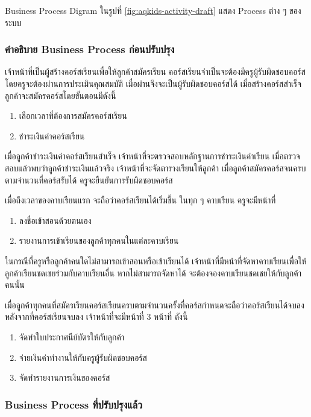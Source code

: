 Business Process Digram ในรูปที่ \ref{fig:aqkids-activity-draft} แสดง Process ต่าง ๆ ของระบบ

\subsubsection{คำอธิบาย Business Process ก่อนปรับปรุง}

เจ้าหน้าที่เป็นผู้สร้างคอร์สเรียนเพื่อให้ลูกค้าสมัครเรียน คอร์สเรียนจำเป็นจะต้องมีครูผู้รับผิดชอบคอร์ส โดยครูจะต้องผ่านการประเมินคุณสมบัติ เมื่อผ่านจึงจะเป็นผู้รับผิดชอบคอร์สได้ เมื่อสร้างคอร์สสำเร็จ ลูกค้าจะสมัครคอร์สโดยขั้นตอนมีดังนี้

\begin{enumerate}
    \item เลือกเวลาที่ต้องการสมัครคอร์สเรียน
    \item ชำระเงินค่าคอร์สเรียน
\end{enumerate}

เมื่อลูกค้าชำระเงินค่าคอร์สเรียนสำเร็จ เจ้าหน้าที่จะตรวจสอบหลักฐานการชำระเงินค่าเรียน เมื่อตรวจสอบแล้วพบว่าลูกค้าชำระเงินแล้วจริง เจ้าหน้าที่จะจัดตารางเรียนให้ลูกค้า เมื่อลูกค้าสมัครคอร์สจนครบตามจำนวนที่คอร์สรับได้ ครูจะยืนยันการรับผิดชอบคอร์ส

เมื่อถึงเวลาของคาบเรียนแรก จะถือว่าคอร์สเรียนได้เริ่มขึ้น ในทุก ๆ คาบเรียน ครูจะมีหน้าที่

\begin{enumerate}
    \item ลงชื่อเข้าสอนด้วยตนเอง
    \item รายงานการเข้าเรียนของลูกค้าทุกคนในแต่ละคาบเรียน
\end{enumerate}

ในกรณีที่ครูหรือลูกค้าคนใดไม่สามารถเข้าสอนหรือเข้าเรียนได้ เจ้าหน้าที่มีหน้าที่จัดหาคาบเรียนเพื่อให้ลูกค้าเรียนชดเชยร่วมกับคาบเรียนอื่น หากไม่สามารถจัดหาได้ จะต้องจองคาบเรียนชดเชยให้กับลูกค้าคนนั้น

เมื่อลูกค้าทุกคนที่สมัครเรียนคอร์สเรียนครบตามจำนวนครั้งที่คอร์สกำหนดจะถือว่าคอร์สเรียนได้จบลง
หลังจากที่คอร์สเรียนจบลง เจ้าหน้าที่จะมีหน้าที่ 3 หน้าที่ ดังนี้

\begin{enumerate}
    \item จัดทำใบประกาศนีย์บัตรให้กับลูกค้า
    \item จ่ายเงินค่าทำงานให้กับครูผู้รับผิดชอบคอร์ส
    \item จัดทำรายงานการเงินของคอร์ส
\end{enumerate}

\subsubsection{Business Process ที่ปรับปรุงแล้ว}

